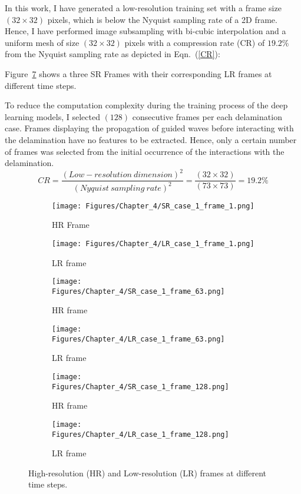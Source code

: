 In this work, I have generated a low-resolution training set with a frame size \((32\times32)\) pixels, which is below the Nyquist sampling rate of a 2D frame.
Hence, I have performed image subsampling with bi-cubic interpolation and a uniform mesh of size \((32\times32)\) pixels with a compression rate (CR) of \(19.2\%\) from the Nyquist sampling rate as depicted in Eqn.~(\ref{CR}):

Figure~\ref{fig:SR_LR} shows a three SR Frames with their corresponding LR frames at different time steps.

To reduce the computation complexity during the training process of the deep learning models, I selected \((128)\) consecutive frames per each delamination case.
Frames displaying the propagation of guided waves before interacting with the delamination have no features to be extracted. 
Hence, only a certain number of frames was selected from the initial occurrence of the interactions with the delamination.
\begin{equation}
	CR = \frac{(Low-resolution\ dimension)^2}{(Nyquist\ sampling\ rate)^2} = \frac{(32\times32)}{(73\times73)}=19.2\%
	\label{CR}
\end{equation}
\begin{figure} [!h]
	\centering
	\begin{subfigure}[b]{.48\textwidth}
		\centering
		\texttt{[image: Figures/Chapter\_4/SR\_case\_1\_frame\_1.png]}
		\caption{HR Frame}
		\label{fig:SR_1}
	\end{subfigure}
	\hfill
	\begin{subfigure}[b]{.48\textwidth}
		\centering
		\texttt{[image: Figures/Chapter\_4/LR\_case\_1\_frame\_1.png]}
		\caption{LR frame}
		\label{fig:LR_1}	
	\end{subfigure}
	\hfill
	\begin{subfigure}[b]{.48\textwidth}
		\centering
		\texttt{[image: Figures/Chapter\_4/SR\_case\_1\_frame\_63.png]}
		\caption{HR frame}
		\label{fig:SR_2}
	\end{subfigure}
	\hfill
	\begin{subfigure}[b]{.48\textwidth}
		\centering
		\texttt{[image: Figures/Chapter\_4/LR\_case\_1\_frame\_63.png]}
		\caption{LR frame}
		\label{fig:LR_2}	
	\end{subfigure}
	\hfill
	\begin{subfigure}[b]{.48\textwidth}
		\centering
		\texttt{[image: Figures/Chapter\_4/SR\_case\_1\_frame\_128.png]}
		\caption{HR frame}
		\label{fig:SR_3}
	\end{subfigure}
	\hfill
	\begin{subfigure}[b]{.48\textwidth}
		\centering
		\texttt{[image: Figures/Chapter\_4/LR\_case\_1\_frame\_128.png]}
		\caption{LR frame}
		\label{fig:LR_3}	
	\end{subfigure}
	\caption{High-resolution (HR) and Low-resolution (LR) frames at different time steps.}
	\label{fig:SR_LR}
\end{figure}
\newpage

